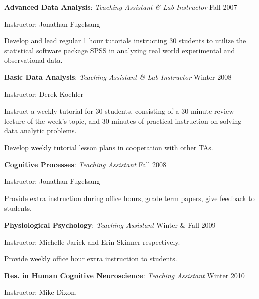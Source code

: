 \documentclass[10pt]{article}
\newenvironment{innerlist}[1][\enskip\textbullet]%
        {\begin{compactenum}[#1]}{\end{compactenum}}
\begin{document}
\begin{outerlist}
\item
  \textbf{Advanced Data Analysis}: \emph{Teaching Assistant \& Lab
  Instructor} \hfill Fall 2007
 \begin{innerlist}
  \item
    Instructor: Jonathan Fugelsang
  \item
    Develop and lead regular 1 hour tutorials instructing 30 students to
    utilize the statistical software package SPSS in analyzing real
    world experimental and observational data.
 \end{innerlist}
\item
  \textbf{Basic Data Analysis}: \emph{Teaching Assistant \& Lab
  Instructor} \hfill    Winter 2008
 \begin{innerlist}
  \item
    Instructor: Derek Koehler
  \item
    Instruct a weekly tutorial for 30 students, consisting of a 30
    minute review lecture of the week's topic, and 30 minutes of
    practical instruction on solving data analytic problems.
  \item
    Develop weekly tutorial lesson plans in cooperation with other TAs.
 \end{innerlist}
\item
  \textbf{Cognitive Processes}: \emph{Teaching Assistant} \hfill    Fall
  2008
 \begin{innerlist}
  \item
    Instructor: Jonathan Fugelsang
  \item
    Provide extra instruction during office hours, grade term papers,
    give feedback to students.
 \end{innerlist}
\item
  \textbf{Physiological Psychology}: \emph{Teaching Assistant}
  \hfill    Winter \& Fall 2009
 \begin{innerlist}
  \item
    Instructor: Michelle Jarick and Erin Skinner respectively.
  \item
    Provide weekly office hour extra instruction to students.
 \end{innerlist}
\item
  \textbf{Res. in Human Cognitive Neuroscience}: \emph{Teaching
  Assistant} \hfill    Winter 2010
 \begin{innerlist}
  \item
    Instructor: Mike Dixon.
  \item

\end{innerlist}
\end{outerlist}
\end{document}
